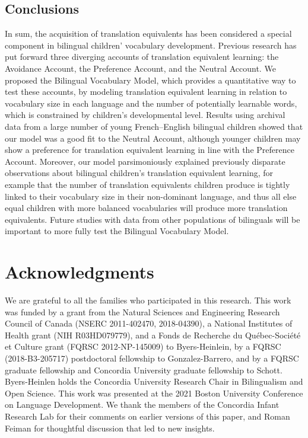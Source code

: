 \documentclass[
  english,
  ,man,floatsintext]{apa6}
\begin{document}
\hypertarget{conclusions}{%
\subsection{Conclusions}\label{conclusions}}

In sum, the acquisition of translation equivalents has been considered a special component in bilingual children' vocabulary development. Previous research has put forward three diverging accounts of translation equivalent learning: the Avoidance Account, the Preference Account, and the Neutral Account. We proposed the Bilingual Vocabulary Model, which provides a quantitative way to test these accounts, by modeling translation equivalent learning in relation to vocabulary size in each language and the number of potentially learnable words, which is constrained by children's developmental level. Results using archival data from a large number of young French--English bilingual children showed that our model was a good fit to the Neutral Account, although younger children may show a preference for translation equivalent learning in line with the Preference Account. Moreover, our model parsimoniously explained previously disparate observations about bilingual children's translation equivalent learning, for example that the number of translation equivalents children produce is tightly linked to their vocabulary size in their non-dominant language, and thus all else equal children with more balanced vocabularies will produce more translation equivalents. Future studies with data from other populations of bilinguals will be important to more fully test the Bilingual Vocabulary Model.

\newpage

\hypertarget{acknowledgments}{%
\section{Acknowledgments}\label{acknowledgments}}

\noindent We are grateful to all the families who participated in this research. This work was funded by a grant from the Natural Sciences and Engineering Research Council of Canada (NSERC 2011-402470, 2018-04390), a National Institutes of Health grant (NIH R03HD079779), and a Fonds de Recherche du Québec-Société et Culture grant (FQRSC 2012-NP-145009) to Byers-Heinlein, by a FQRSC (2018-B3-205717) postdoctoral fellowship to Gonzalez-Barrero, and by a FQRSC graduate fellowship and Concordia University graduate fellowship to Schott. Byers-Heinlen holds the Concordia University Research Chair in Bilingualism and Open Science. This work was presented at the 2021 Boston University Conference on Language Development. We thank the members of the Concordia Infant Research Lab for their comments on earlier versions of this paper, and Roman Feiman for thoughtful discussion that led to new insights.
\end{document}
